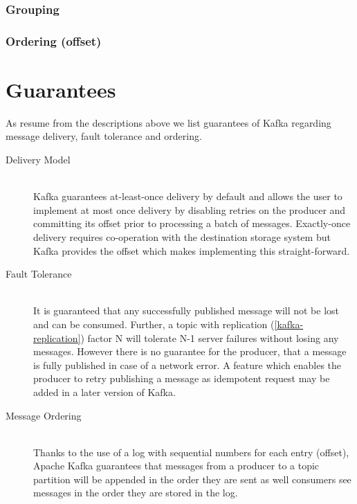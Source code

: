 \subsubsection{Grouping}

\subsubsection{Ordering (offset)}

\section{Guarantees}
\label{kafka-guarantees}
As resume from the descriptions above we list guarantees of Kafka regarding
message delivery, fault tolerance and ordering. 

\begin{description}

\item[Delivery Model] \hfill \\
    Kafka guarantees at-least-once delivery by default and allows the user to
    implement at most once delivery by disabling retries on the producer and
    committing its offset prior to processing a batch of messages. Exactly-once
    delivery requires co-operation with the destination storage system but Kafka
    provides the offset which makes implementing this
    straight-forward.\cite{apachekafka}

\item[Fault Tolerance] \hfill \\
    It is guaranteed that any successfully published message will not be lost
    and can be consumed. Further, a topic with replication
    (\ref{kafka-replication}) factor N will tolerate N-1 server failures without
    losing any messages. However there is no guarantee for the producer, that
    a message is fully published in case of a network error. A feature which
    enables the producer to retry publishing a message as idempotent
     request may be added in a later version of Kafka. \cite{apachekafka}

\item[Message Ordering] \hfill \\
    Thanks to the use of a log with sequential numbers for each entry (offset),
    Apache Kafka guarantees that messages from a producer to a topic partition
    will be appended in the order they are sent as well consumers see messages
    in the order they are stored in the log. \cite{apachekafka}

\end{description}


